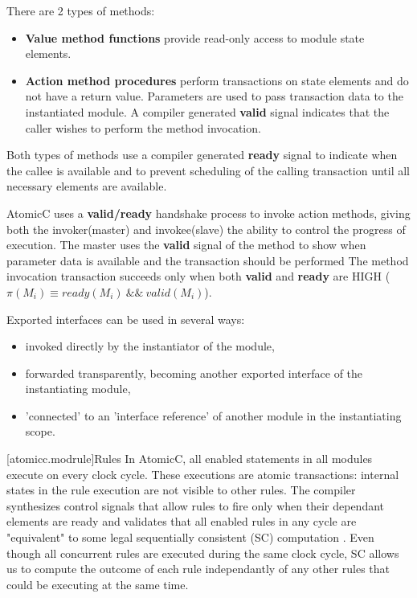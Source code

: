 There are 2 types of methods:
\begin{itemize}
\item \textbf{Value method functions} provide read-only access to module state elements.
\item \textbf{Action method procedures} perform transactions on state elements
and do not have a return value.
Parameters are used to pass transaction data to the instantiated module.
A compiler generated
\textbf{valid} signal indicates that the caller wishes to perform the method invocation.
\end{itemize}

Both types of methods use a compiler generated \textbf{ready} signal
to indicate when the callee is available and
to prevent scheduling of the calling transaction until all necessary elements are
available.

AtomicC uses a \textbf{valid/ready} handshake process\cite{Fletcher2009, AXISpec} to invoke action methods,
giving both the invoker(master) and invokee(slave) the ability to control the progress of execution.
The master uses the \textbf{valid} signal
of the method to show when parameter data is available and the transaction should be performed
The method invocation transaction succeeds only when
both \textbf{valid} and \textbf{ready} are HIGH ($\pi(M_{i}) \equiv ready(M_{i})\ \&\&\ valid(M_{i})$).

Exported interfaces can be used in several ways:
\begin{itemize}
\item invoked directly by the instantiator of the module,
\item forwarded transparently, becoming another exported interface of the instantiating module,
\item 'connected' to an 'interface reference' of another module in the instantiating scope.
\end{itemize}

[atomicc.modrule]{Rules}
In AtomicC, all enabled statements in all modules execute on every clock cycle.
These executions are atomic transactions: internal states in the rule
execution are not visible to other rules.
The compiler synthesizes control signals that allow rules to fire
only when their dependant elements are ready and validates that all enabled
rules in any cycle are
"equivalent" to some legal sequentially consistent (SC)
computation \cite{Lamport:1979:MMC:1311099.1311750}.
Even though all concurrent rules are executed during the same clock cycle, SC allows us to compute the
outcome of each rule independantly of any other rules that could be executing at the same time.


